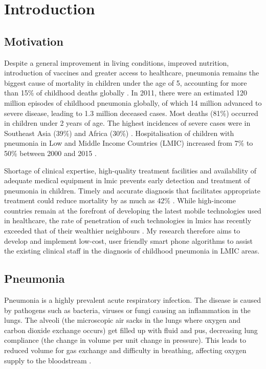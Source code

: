 \chapter{Introduction}
\label{chapter:introduction}

\section{Motivation}

Despite a general improvement in living conditions, improved nutrition, introduction of vaccines and greater access to healthcare, pneumonia remains the biggest cause of mortality in children under the age of 5, accounting for more than 15\% of childhood deaths globally \cite{troeger2017estimates}. In 2011, there were an estimated 120 million episodes of childhood pneumonia globally, of which 14 million advanced to severe disease, leading to 1.3 million deceased cases. Most deaths (81\%) occurred in children under 2 years of age. The highest incidences of severe cases were in Southeast Asia (39\%) and Africa (30\%) \cite{zar2013pneumonia}. Hospitalisation of children with pneumonia in Low and Middle Income Countries (LMIC) increased from 7\% to 50\% between 2000 and 2015 \cite{mcallister2019global}. 

Shortage of clinical expertise, high-quality treatment facilities and availability of adequate medical equipment in \gls{lmic} prevents early detection and treatment of pneumonia in children. Timely and accurate diagnosis that facilitates appropriate treatment could reduce mortality by as much as 42\% \cite{wardlaw2006pneumonia}. While high-income countries remain at the forefront of developing the latest mobile technologies used in healthcare, the rate of penetration of such technologies in \gls{lmic}s has recently exceeded that of their wealthier neighbours \cite{bastawrous2013mobile}. My research therefore aims to develop and implement low-cost, user friendly smart phone algorithms to assist the existing clinical staff in the diagnosis of childhood pneumonia in LMIC areas.

\section{Pneumonia}

Pneumonia is a highly prevalent acute respiratory infection. The disease is caused by pathogens such as bacteria, viruses or fungi causing an inflammation in the lungs. 
The alveoli (the microscopic air sacks in the lungs where oxygen and carbon dioxide exchange occurs) get filled up with fluid and pus, decreasing lung compliance (the change in volume per unit change in pressure). This leads to reduced volume for gas exchange and difficulty in breathing, affecting oxygen supply to the bloodstream \cite{ali2013role}.

